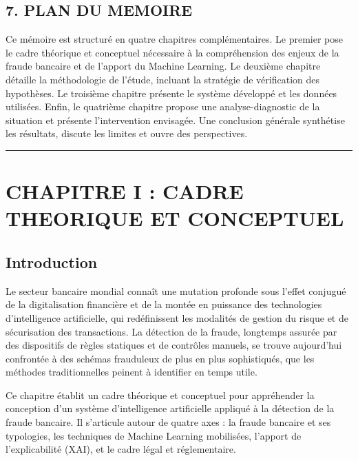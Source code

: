 \documentclass[
  12pt,
]{article}
\begin{document}
\subsection{7. PLAN DU MEMOIRE}\label{plan-du-memoire}

Ce mémoire est structuré en quatre chapitres complémentaires. Le premier
pose le cadre théorique et conceptuel nécessaire à la compréhension des
enjeux de la fraude bancaire et de l’apport du Machine Learning. Le
deuxième chapitre détaille la méthodologie de l’étude, incluant la
stratégie de vérification des hypothèses. Le troisième chapitre présente
le système développé et les données utilisées. Enfin, le quatrième
chapitre propose une analyse-diagnostic de la situation et présente
l’intervention envisagée. Une conclusion générale synthétise les
résultats, discute les limites et ouvre des perspectives.

\begin{center}\rule{0.5\linewidth}{0.5pt}\end{center}

\section{CHAPITRE I : CADRE THEORIQUE ET
CONCEPTUEL}\label{chapitre-i-cadre-theorique-et-conceptuel}

\subsection{Introduction}\label{introduction}

Le secteur bancaire mondial connaît une mutation profonde sous l’effet
conjugué de la digitalisation financière et de la montée en puissance
des technologies d’intelligence artificielle, qui redéfinissent les
modalités de gestion du risque et de sécurisation des transactions. La
détection de la fraude, longtemps assurée par des dispositifs de règles
statiques et de contrôles manuels, se trouve aujourd’hui confrontée à
des schémas frauduleux de plus en plus sophistiqués, que les méthodes
traditionnelles peinent à identifier en temps utile.

Ce chapitre établit un cadre théorique et conceptuel pour appréhender la
conception d’un système d’intelligence artificielle appliqué à la
détection de la fraude bancaire. Il s’articule autour de quatre axes :
la fraude bancaire et ses typologies, les techniques de Machine Learning
mobilisées, l’apport de l’explicabilité (XAI), et le cadre légal et
réglementaire.
\end{document}
